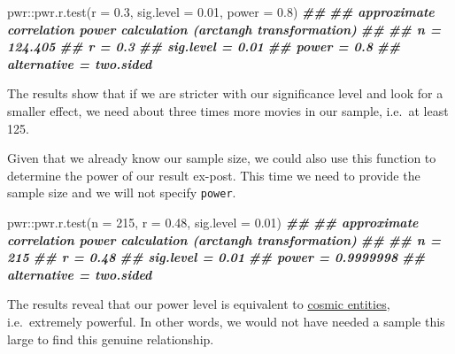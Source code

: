 \documentclass[
]{book}
\newenvironment{Shaded}{\begin{snugshade}}{\end{snugshade}}
\newcommand{\AttributeTok}[1]{\textcolor[rgb]{0.77,0.63,0.00}{#1}}
\newcommand{\DecValTok}[1]{\textcolor[rgb]{0.00,0.00,0.81}{#1}}
\newcommand{\DocumentationTok}[1]{\textcolor[rgb]{0.56,0.35,0.01}{\textbf{\textit{#1}}}}
\newcommand{\FloatTok}[1]{\textcolor[rgb]{0.00,0.00,0.81}{#1}}
\newcommand{\FunctionTok}[1]{\textcolor[rgb]{0.00,0.00,0.00}{#1}}
\newcommand{\NormalTok}[1]{#1}
\newcommand{\SpecialCharTok}[1]{\textcolor[rgb]{0.00,0.00,0.00}{#1}}
\begin{document}
\begin{Shaded}
\begin{Highlighting}[]
\NormalTok{pwr}\SpecialCharTok{::}\FunctionTok{pwr.r.test}\NormalTok{(}\AttributeTok{r =} \FloatTok{0.3}\NormalTok{,}
                \AttributeTok{sig.level =} \FloatTok{0.01}\NormalTok{,}
                \AttributeTok{power =} \FloatTok{0.8}\NormalTok{)}
\DocumentationTok{\#\# }
\DocumentationTok{\#\#      approximate correlation power calculation (arctangh transformation) }
\DocumentationTok{\#\# }
\DocumentationTok{\#\#               n = 124.405}
\DocumentationTok{\#\#               r = 0.3}
\DocumentationTok{\#\#       sig.level = 0.01}
\DocumentationTok{\#\#           power = 0.8}
\DocumentationTok{\#\#     alternative = two.sided}
\end{Highlighting}
\end{Shaded}

The results show that if we are stricter with our significance level and look for a smaller effect, we need about three times more movies in our sample, i.e.~at least 125.

Given that we already know our sample size, we could also use this function to determine the power of our result ex-post. This time we need to provide the sample size and we will not specify \texttt{power}.

\begin{Shaded}
\begin{Highlighting}[]
\NormalTok{pwr}\SpecialCharTok{::}\FunctionTok{pwr.r.test}\NormalTok{(}\AttributeTok{n =} \DecValTok{215}\NormalTok{,}
                \AttributeTok{r =} \FloatTok{0.48}\NormalTok{,}
                \AttributeTok{sig.level =} \FloatTok{0.01}\NormalTok{)}
\DocumentationTok{\#\# }
\DocumentationTok{\#\#      approximate correlation power calculation (arctangh transformation) }
\DocumentationTok{\#\# }
\DocumentationTok{\#\#               n = 215}
\DocumentationTok{\#\#               r = 0.48}
\DocumentationTok{\#\#       sig.level = 0.01}
\DocumentationTok{\#\#           power = 0.9999998}
\DocumentationTok{\#\#     alternative = two.sided}
\end{Highlighting}
\end{Shaded}

The results reveal that our power level is equivalent to \href{https://marvelcinematicuniverse.fandom.com/wiki/Cosmic_Entities}{cosmic entities}, i.e.~extremely powerful. In other words, we would not have needed a sample this large to find this genuine relationship.
\end{document}
